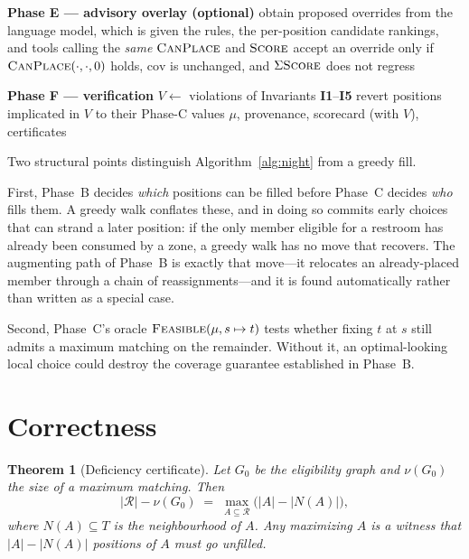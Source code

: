 \documentclass[11pt,a4paper]{article}
\newtheorem{theorem}{Theorem}
\theoremstyle{definition}
\theoremstyle{remark}
\newcommand{\canplace}{\textsc{CanPlace}}
\newcommand{\score}{\textsc{Score}}
\begin{document}
\begin{algorithm}[htbp]
\begin{algorithmic}[1]
\Statex \textbf{Phase E --- advisory overlay (optional)}
\State obtain proposed overrides from the language model, which is given the
       rules, the per-position candidate rankings, and tools calling the
       \emph{same} $\canplace$ and $\score$
\State accept an override only if $\canplace(\cdot,\cdot,0)$ holds,
       $\mathrm{cov}$ is unchanged, and $\Sigma\score$ does not regress

\Statex \textbf{Phase F --- verification}
\Repeat
  \State $V \gets$ violations of Invariants \textbf{I1}--\textbf{I5}
  \State revert positions implicated in $V$ to their Phase-C values
\State \Return $\mu$, provenance, scorecard (with $V$), certificates
\end{algorithmic}
\end{algorithm}

Two structural points distinguish Algorithm~\ref{alg:night} from a greedy
fill.

First, Phase~B decides \emph{which} positions can be filled before Phase~C
decides \emph{who} fills them. A greedy walk conflates these, and in doing so
commits early choices that can strand a later position: if the only member
eligible for a restroom has already been consumed by a zone, a greedy walk
has no move that recovers. The augmenting path of Phase~B is exactly that
move---it relocates an already-placed member through a chain of
reassignments---and it is found automatically rather than written as a
special case.

Second, Phase~C's oracle $\textsc{Feasible}(\mu, s \mapsto t)$ tests whether
fixing $t$ at $s$ still admits a maximum matching on the remainder. Without
it, an optimal-looking local choice could destroy the coverage guarantee
established in Phase~B.

\section{Correctness}
\label{sec:correctness}

\begin{theorem}[Deficiency certificate]
\label{thm:hall}
Let $G_0$ be the eligibility graph and $\nu(G_0)$ the size of a maximum
matching. Then
\begin{equation}
\lvert \mathcal{R} \rvert - \nu(G_0)
\;=\; \max_{A \subseteq \mathcal{R}}
      \bigl( \lvert A \rvert - \lvert N(A) \rvert \bigr),
\end{equation}
where $N(A) \subseteq T$ is the neighbourhood of $A$. Any maximizing $A$ is a
witness that $\lvert A \rvert - \lvert N(A) \rvert$ positions of $A$ must go
unfilled.
\end{theorem}
\end{document}
